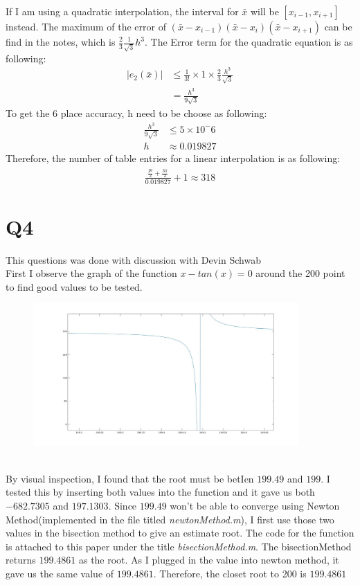 \documentclass{article}
\begin{document}
If I am using a quadratic interpolation, the interval for $\bar{x}$ will be $[x_{i-1}, x_{i+1}]$ instead. The maximum of the error of $(\bar{x} - x_{i-1})(\bar{x} - x_i)(\bar{x} - x_{i+1})$ can be find in the notes, which is $\frac{2}{3}\frac{1}{\sqrt{3}}h^3$. The Error term for the quadratic equation is as following:
\begin{equation*}
\begin{aligned}
|e_2(\bar{x})| &\leq \frac{1}{3!} \times 1 \times \frac{2}{3}\frac{h^3}{\sqrt{3}} \\
&= \frac{h^3}{9\sqrt{3}}
\end{aligned}
\end{equation*}
To get the 6 place accuracy, h need to be choose as following:
\begin{equation*}
\begin{aligned}
\frac{h^3}{9\sqrt{3}} &\leq 5 \times 10^-6\\
	h &\approx 0.019827	
\end{aligned}
\end{equation*}
Therefore, the number of table entries for a linear interpolation is as following:
\begin{equation*}
\begin{aligned}
\frac{\frac{pi}{2} + \frac{3\pi}{2}}{0.019827} + 1 \approx 318
\end{aligned}
\end{equation*}


\section{Q4}
This questions was done with discussion with Devin Schwab\\
First I observe the graph of the function $x - tan(x) = 0$ around the 200 point to find good values to be tested. 
\begin{figure}[h]
\includegraphics[width=4in]{p4.jpg}
\end{figure}\\
By visual inspection, I found that the root must be betIen $199.49$ and $199$. I tested this by inserting both values into the function and it gave us both $-682.7305$ and $197.1303$. Since $199.49$ won't be able to converge using Newton Method(implemented in the file titled \textit{newtonMethod.m}), I first use those two values in the bisection method to give an estimate root. The code for the function is attached to this paper under the title \textit{bisectionMethod.m}. The bisectionMethod returns $199.4861$ as the root. As I plugged in the value into newton method, it gave us the same value of $199.4861$. Therefore, the closet root to 200 is $199.4861$
\end{document}
